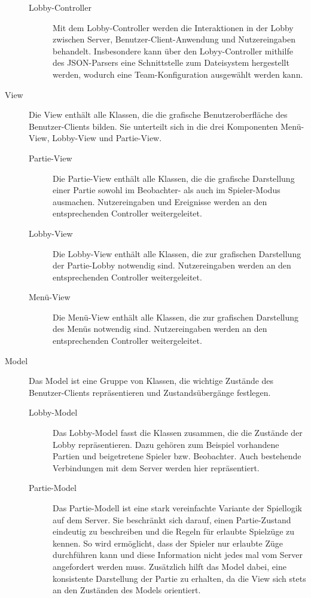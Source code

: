 \begin{description}
\begin{description}
				\item[Lobby-Controller]
				Mit dem Lobby-Controller werden die Interaktionen in der Lobby zwischen Server, Benutzer-Client-Anwendung und Nutzereingaben behandelt. Insbesondere kann über den Lobyy-Controller mithilfe des JSON-Parsers eine Schnittstelle zum Dateisystem hergestellt werden, wodurch eine Team-Konfiguration ausgewählt werden kann.
			\end{description}
			
			\item[View]
			Die View enthält alle Klassen, die die grafische Benutzeroberfläche des Benutzer-Clients bilden. Sie unterteilt sich in die drei Komponenten Menü-View, Lobby-View und Partie-View.
			\begin{description}
				\item[Partie-View]
				Die Partie-View enthält alle Klassen, die die grafische Darstellung einer Partie sowohl im Beobachter- als auch im Spieler-Modus ausmachen. Nutzereingaben und Ereignisse werden an den entsprechenden Controller weitergeleitet.
			
			
				\item[Lobby-View]
				Die Lobby-View enthält alle Klassen, die zur grafischen Darstellung der Partie-Lobby notwendig sind. Nutzereingaben werden an den entsprechenden Controller weitergeleitet.
			
			
				\item[Menü-View]
				Die Menü-View enthält alle Klassen, die zur grafischen Darstellung des Menüs notwendig sind. Nutzereingaben werden an den entsprechenden Controller weitergeleitet.

			\end{description}
			
			
			
			\item[Model]
			Das Model ist eine Gruppe von Klassen, die wichtige Zustände des Benutzer-Clients repräsentieren und Zustandsübergänge festlegen.
			
			\begin{description}
				\item[Lobby-Model]
				Das Lobby-Model fasst die Klassen zusammen, die die Zustände der Lobby repräsentieren. Dazu gehören zum Beispiel vorhandene Partien und beigetretene Spieler bzw. Beobachter. Auch bestehende Verbindungen mit dem Server werden hier repräsentiert.
			
				\item[Partie-Model]
				Das Partie-Modell ist eine stark vereinfachte Variante der Spiellogik auf dem Server. Sie beschränkt sich darauf, einen Partie-Zustand eindeutig zu beschreiben und die Regeln für erlaubte Spielzüge zu kennen. So wird ermöglicht, dass der Spieler nur erlaubte Züge durchführen kann und diese Information nicht jedes mal vom Server angefordert werden muss. Zusätzlich hilft das Model dabei, eine konsistente Darstellung der Partie zu erhalten, da die View sich stets an den Zuständen des Models orientiert.
			\end{description}
			

\end{description}
